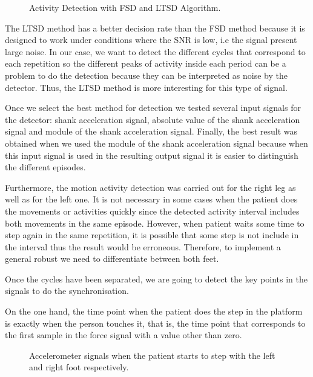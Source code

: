 \begin{figure}[H]
	\centering
	\caption{Activity Detection with FSD and LTSD Algorithm.}
	\label{fig:activityDetection}
\end{figure} 

The LTSD method has a better decision rate than the FSD method because it is designed to work under conditions where the SNR is low, i.e the signal present large noise\cite{A.Olivares2013}. In our case, we want to detect the different cycles that correspond to each repetition so the different peaks of activity inside each period can be a problem to do the detection because they can be interpreted as noise by the detector. Thus, the LTSD method is more interesting for this type of signal.

Once we select the best method for detection we tested several input signals for the detector: shank acceleration signal, absolute value of the shank acceleration signal and module of the shank acceleration signal. Finally, the best result was obtained when we used the module of the shank acceleration signal because when this input signal is used in the resulting output signal it is easier to distinguish the different episodes.

Furthermore, the motion activity detection was carried out for the right leg as well as for the left one. It is not necessary in some cases when the patient does the movements or activities quickly since the detected activity interval includes both movements in the same episode. However, when patient waits some time to step again in the same repetition, it is possible that some step is not  include in the interval thus the result would be erroneous. Therefore, to implement a general robust we need to differentiate between both feet.

Once the cycles have been separated, we are going to detect the key points in the signals to do the synchronisation. 

On the one hand, the time point when the patient does the step in the platform is exactly when the person touches it, that is, the time point that corresponds to the first sample in the force signal with a value other than zero.

\begin{figure}[H]
	\centering
	\caption{Accelerometer signals when the patient starts to step with the left and right foot respectively.}
	\label{fig:startLeftRight}
\end{figure} 


